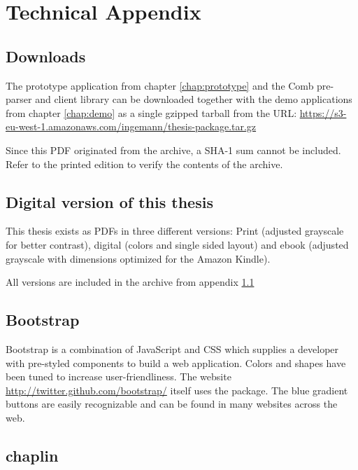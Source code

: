 \documentclass[thesis.tex]{subfiles}
\begin{document}
\chapter{Technical Appendix}

\section{Downloads}
\label{app:downloads}
The prototype application from chapter \ref{chap:prototype} and the Comb
pre-parser and client library can be downloaded together with
the demo applications from chapter \ref{chap:demo} as a single gzipped tarball
from the URL: \url{https://s3-eu-west-1.amazonaws.com/ingemann/thesis-package.tar.gz}

Since this PDF originated from the archive, a SHA-1 sum cannot be included.
Refer to the printed edition to verify the contents of the archive.


\section{Digital version of this thesis}
This thesis exists as PDFs in three different versions:
Print (adjusted grayscale for better contrast),
digital (colors and single sided layout) and
ebook (adjusted grayscale with dimensions optimized for the Amazon Kindle).

All versions are included in the archive from appendix \ref{app:downloads}

\section{Bootstrap}
\label{app:bootstrap}
Bootstrap is a combination of JavaScript and CSS which supplies a developer
with pre-styled components to build a web application. Colors and shapes
have been tuned to increase user-friendliness.
The website \url{http://twitter.github.com/bootstrap/} itself uses the package.
The blue gradient buttons are easily recognizable and can be found in many
websites across the web.

\section{chaplin}
\label{app:chaplin}
\end{document}
